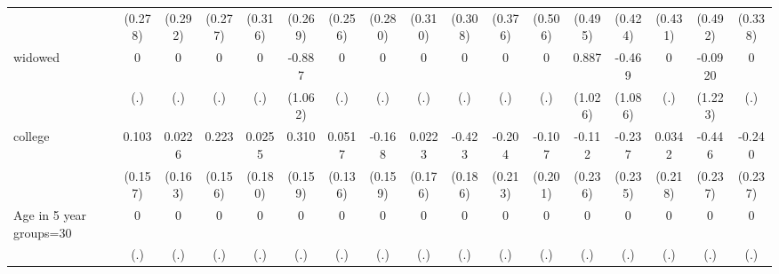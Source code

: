 {\begin{tabular}{l*{16}{c}}
                    &     (0.278)         &     (0.292)         &     (0.277)         &     (0.316)         &     (0.269)         &     (0.256)         &     (0.280)         &     (0.310)         &     (0.308)         &     (0.376)         &     (0.506)         &     (0.495)         &     (0.424)         &     (0.431)         &     (0.492)         &     (0.338)         \\
[1em]
widowed             &           0         &           0         &           0         &           0         &      -0.887         &           0         &           0         &           0         &           0         &           0         &           0         &       0.887         &      -0.469         &           0         &     -0.0920         &           0         \\
                    &         (.)         &         (.)         &         (.)         &         (.)         &     (1.062)         &         (.)         &         (.)         &         (.)         &         (.)         &         (.)         &         (.)         &     (1.026)         &     (1.086)         &         (.)         &     (1.223)         &         (.)         \\
[1em]
college             &       0.103         &      0.0226         &       0.223         &      0.0255         &       0.310         &      0.0517         &      -0.168         &      0.0223         &      -0.423\sym{*}  &      -0.204         &      -0.107         &      -0.112         &      -0.237         &      0.0342         &      -0.446         &      -0.240         \\
                    &     (0.157)         &     (0.163)         &     (0.156)         &     (0.180)         &     (0.159)         &     (0.136)         &     (0.159)         &     (0.176)         &     (0.186)         &     (0.213)         &     (0.201)         &     (0.236)         &     (0.235)         &     (0.218)         &     (0.237)         &     (0.237)         \\
[1em]
Age in 5 year groups=30&           0         &           0         &           0         &           0         &           0         &           0         &           0         &           0         &           0         &           0         &           0         &           0         &           0         &           0         &           0         &           0         \\
                    &         (.)         &         (.)         &         (.)         &         (.)         &         (.)         &         (.)         &         (.)         &         (.)         &         (.)         &         (.)         &         (.)         &         (.)         &         (.)         &         (.)         &         (.)         &         (.)         \\

\end{tabular}}
